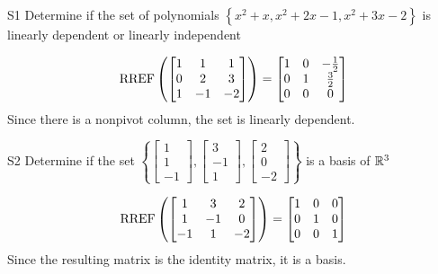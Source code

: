 \documentclass{sbgLAexam}
\begin{document}
\begin{extract}\newpage\end{extract}
\begin{problem}{S1}
Determine if the set of polynomials  $\left\{x^2+x, x^2+2x-1, x^2+3x-2\right\}$ is  linearly dependent or linearly independent
\end{problem}
\begin{solution}
$$\operatorname{RREF}\left( \begin{bmatrix} 1 &  1 & 1 \\ 0  & 2 & 3 \\ 1  & -1 & -2 \end{bmatrix} \right) = \begin{bmatrix} 1 &  0 & -\frac{1}{2} \\ 0  & 1 & \frac{3}{2} \\ 0& 0 & 0  \end{bmatrix}$$
Since there is a nonpivot column, the set is linearly dependent.
\end{solution}


\begin{problem}{S2}
Determine if the set $\left\{\begin{bmatrix} 1 \\ 1 \\ -1 \end{bmatrix}, \begin{bmatrix} 3 \\ -1 \\ 1 \end{bmatrix},\begin{bmatrix} 2 \\ 0 \\ -2 \end{bmatrix}\right\}$ is a basis of $\mathbb{R}^3$
\end{problem}
\begin{solution}
$$\operatorname{RREF}\left(\begin{bmatrix} 1 & 3 & 2 \\ 1 & -1 & 0 \\ -1 & 1 & -2 \end{bmatrix} \right)= \begin{bmatrix} 1 & 0 &0 \\ 0 & 1 & 0 \\ 0 & 0 & 1\end{bmatrix}$$
Since the resulting matrix is the identity matrix, it is a basis.
\end{solution}
\end{document}
